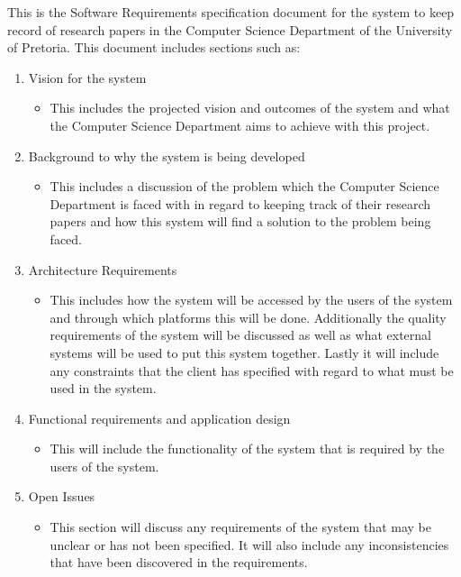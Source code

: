 \documentclass[a4paper,12pt]{article}
\begin{document}
This is the Software Requirements specification document for the system to keep record of research papers in the Computer Science Department of the University of Pretoria.
This document includes sections such as:
\begin{enumerate}
    \item Vision for the system
\begin{itemize}
    \item This includes the projected vision and outcomes of the system and what the Computer Science Department aims to achieve with this project. 
\end{itemize}

    \item Background to why the system is being developed

\begin{itemize}
    \item This includes a discussion of the problem which the Computer Science Department is faced with in regard to keeping track of their research papers and how this system will find a solution to the problem being faced. 
\end{itemize}

    \item Architecture Requirements
\setlength{\parindent}{2.5em}

\begin{itemize}
    \item This includes how the system will be accessed by the users of the system and through which platforms this will be done. Additionally the quality requirements of the system will be discussed as well as what external systems will be used to put this system together. Lastly it will include any constraints that the client has specified with regard to what must be used in the system. 
\end{itemize}

    \item Functional requirements and application design

\begin{itemize}
    \item This will include the functionality of the system that is required by the users of the system. 
\end{itemize}
    \item Open Issues
\begin{itemize}
    \item This section will discuss any requirements of the system that may be unclear or has not been specified. It will also include any inconsistencies that have been discovered in the requirements. 
\end{itemize}
\end{enumerate}
\end{document}
